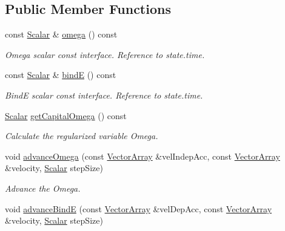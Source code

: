 \subsection*{Public Member Functions}
\begin{DoxyCompactItemize}
\item 
const \mbox{\hyperlink{class_space_h_1_1_vel_indep_particles_aeb47d8131b30ed790320ff634f0d6af1}{Scalar}} \& \mbox{\hyperlink{class_space_h_1_1_regu_particles_a70cead0da9ed17befb6580ca6e6bc11c}{omega}} () const
\begin{DoxyCompactList}\small\item\em Omega scalar const interface. Reference to state.\+time. \end{DoxyCompactList}\item 
const \mbox{\hyperlink{class_space_h_1_1_vel_indep_particles_aeb47d8131b30ed790320ff634f0d6af1}{Scalar}} \& \mbox{\hyperlink{class_space_h_1_1_regu_particles_af0f897b60e335bdecaf64588a2d4cefa}{bindE}} () const
\begin{DoxyCompactList}\small\item\em BindE scalar const interface. Reference to state.\+time. \end{DoxyCompactList}\item 
\mbox{\hyperlink{class_space_h_1_1_vel_indep_particles_aeb47d8131b30ed790320ff634f0d6af1}{Scalar}} \mbox{\hyperlink{class_space_h_1_1_regu_particles_a4f9e99c1492db8dbcfa232f285227cb6}{get\+Capital\+Omega}} () const
\begin{DoxyCompactList}\small\item\em Calculate the regularized variable Omega. \end{DoxyCompactList}\item 
void \mbox{\hyperlink{class_space_h_1_1_regu_particles_a5248a79d323188ef82e35defd0ffacf7}{advance\+Omega}} (const \mbox{\hyperlink{class_space_h_1_1_vel_indep_particles_aa9983058940249df8b00fa800e8cbad2}{Vector\+Array}} \&vel\+Indep\+Acc, const \mbox{\hyperlink{class_space_h_1_1_vel_indep_particles_aa9983058940249df8b00fa800e8cbad2}{Vector\+Array}} \&velocity, \mbox{\hyperlink{class_space_h_1_1_vel_indep_particles_aeb47d8131b30ed790320ff634f0d6af1}{Scalar}} step\+Size)
\begin{DoxyCompactList}\small\item\em Advance the Omega. \end{DoxyCompactList}\item 
void \mbox{\hyperlink{class_space_h_1_1_regu_particles_af84c5b59251cc1c412124a6127aa5a98}{advance\+BindE}} (const \mbox{\hyperlink{class_space_h_1_1_vel_indep_particles_aa9983058940249df8b00fa800e8cbad2}{Vector\+Array}} \&vel\+Dep\+Acc, const \mbox{\hyperlink{class_space_h_1_1_vel_indep_particles_aa9983058940249df8b00fa800e8cbad2}{Vector\+Array}} \&velocity, \mbox{\hyperlink{class_space_h_1_1_vel_indep_particles_aeb47d8131b30ed790320ff634f0d6af1}{Scalar}} step\+Size)

\end{DoxyCompactItemize}
